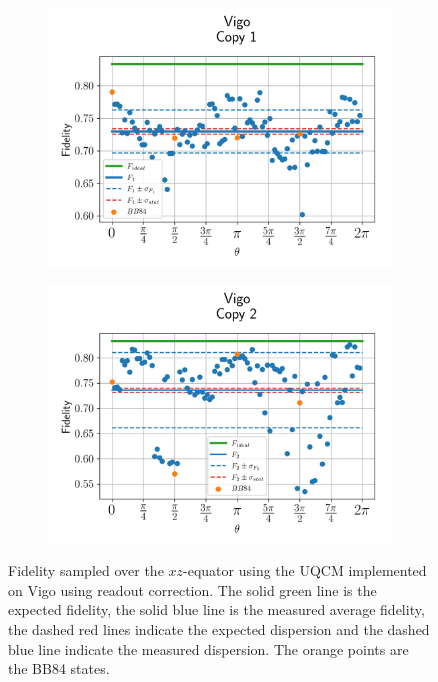 \begin{figure}[H]
    \centering
    \begin{subfigure}{.45\textwidth}
      \centering
      \includegraphics[width=\textwidth]{Figures/UQCM/IBM/OnlyEquator/results_corrected_vigo_copy1.png}
    \end{subfigure}%
    \begin{subfigure}{.45\textwidth}
      \centering
      \includegraphics[width=\textwidth]{Figures/UQCM/IBM/OnlyEquator/results_corrected_vigo_copy2.png}
    \end{subfigure}
    \caption{Fidelity sampled over the $xz$-equator using the UQCM implemented on Vigo using readout correction. The solid green line is the expected fidelity, the solid blue line is the measured average fidelity, the dashed red lines indicate the expected dispersion and the dashed blue line indicate the measured dispersion. The orange points are the BB84 states.}
    \label{fig:uqcm_eq_vigo}
\end{figure}


